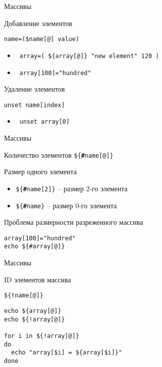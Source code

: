 \begin{frame}[fragile]{Массивы}

	\begin{block}{Добавление элементов}

		{\tt name=(\$name[@] value)}

		\begin{itemize}
			\item \verb+ array=( ${array[@]} "new element" 120 ) +
			\item \verb+ array[100]="hundred"   +
		\end{itemize}
	\end{block}

	\begin{block}{Удаление элементов}

		{\tt unset name[index]}

		\begin{itemize}
			\item \verb+ unset array[0] +
		\end{itemize}
	\end{block}
\end{frame}


\begin{frame}[fragile]{Массивы}
	\begin{block}{Количество элементов}
		{\tt \$\{{\bf \#}name[@]\}}
	\end{block}

	\pause

	\begin{alertblock}{Размер одного элемента}
		\begin{itemize}
			\item {\tt \$\{{\bf \#}name[2]\}} -- размер 2-го элемента
			\item {\tt \$\{{\bf \#}name\}} -- размер 0-го элемента
		\end{itemize}
	\end{alertblock}

	\pause
	\begin{alertblock}{Проблема размерности разреженного массива}
		\begin{lstlisting}
array[100]="hundred"
echo ${#array[@]}
		\end{lstlisting}
	\end{alertblock}
\end{frame}

\begin{frame}[fragile]{Массивы}
	\begin{block}{ID элементов массива}

		{\tt \$\{{\bf !}name[@]\}}

		\begin{lstlisting}
echo ${array[@]}
echo ${!array[@]}

for i in ${!array[@]}
do
  echo "array[$i] = ${array[$i]}"
done
		\end{lstlisting}
	\end{block}
\end{frame}


